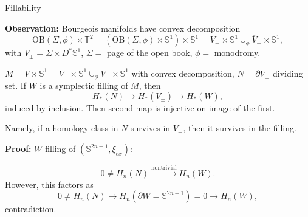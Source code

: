 \documentclass{beamer}
\begin{document}
\begin{frame}{Fillability}

\textbf{Observation:} Bourgeois manifolds have convex decomposition 
$$\mathrm{OB}(\Sigma, \phi) \times \mathbb T^2=(\mathrm{OB}(\Sigma, \phi)\times \mathbb S^1)\times \mathbb S^1= V_+\times \mathbb S^1 \cup_\phi \overline{V}_-\times \mathbb S^1,$$ with $V_\pm=\Sigma \times D^*\mathbb S^1$, $\Sigma=$ page of the open book, $\phi=$ monodromy.

\pause

\begin{theorem}

$M=V\times \mathbb S^1=V_+\times \mathbb S^1\cup_\phi \overline{V_-}\times \mathbb S^1$ with convex decomposition, $N=\partial V_\pm$ dividing set. If $W$ is a symplectic filling of $M$, then
$$
H_*(N)\rightarrow H_*(V_\pm) \rightarrow H_*(W),
$$
induced by inclusion. Then second map is injective on image of the first.
\end{theorem}

Namely, if a homology class in $N$ survives in $V_\pm$, then it survives in the filling.
    
\end{frame}

\begin{frame}

\textbf{Proof:} $W$ filling of $(\mathbb S^{2n+1},\xi_{ex})$:

$$
0\neq H_n(N) \xrightarrow{\text{nontrivial}} H_n(W).
$$
However, this factors as
$$
0\neq H_n(N) \rightarrow H_n(\partial W = \mathbb S^{2n+1})=0 \rightarrow H_n(W),
$$
contradiction.
\end{frame}
\end{document}

